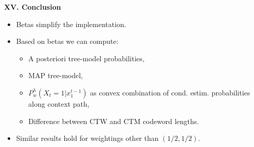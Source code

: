\documentclass[a4paper,landscape]{slides} %
\newcommand{\xtm}{x_{1}^{t-1}}
\begin{document}
\begin{slide}{\bf\Large\color{blue} XV. Conclusion}
\begin{itemize}
\item
Betas simplify the implementation.
\item
Based on betas we can compute:
\begin{itemize}
\item
A posteriori tree-model probabilities,
\item
MAP tree-model,
\item
$P_w^{\lambda}(X_t=1|\xtm)$ as convex combination of cond. estim. probabilities along context path,
\item
Difference between CTW and CTM codeword lengths.
\end{itemize}
\item
Similar results hold for weightings other than $(1/2,1/2)$.
\end{itemize}


\end{slide}

\end{document}
